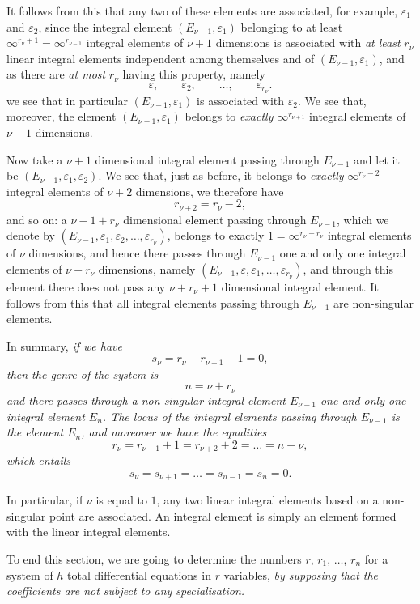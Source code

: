 \documentclass[leqno,11pt]{book}
\makeatletter
\theoremstyle{shape1}
\theoremstyle{shapesmall}
\let\old@epsilon\epsilon
\let\old@varepsilon\varepsilon
\let\epsilon\old@varepsilon
\let\varepsilon\old@epsilon
\makeatother
\begin{document}
It follows from this that any two of these elements are associated, for example, $\epsilon_{1}$ and $\epsilon_{2}$, since the integral element $(E_{\nu-1},\epsilon_{1})$ belonging to at least $\infty^{r_{\nu}+1}=\infty^{r_{\nu-1}}$ integral elements of $\nu+1$ dimensions is associated with \emph{at least} $r_{\nu}$ linear integral elements independent among themselves and of $(E_{\nu-1},\epsilon_{1})$, and as there are \emph{at most} $r_{\nu}$ having this property, namely
\[
\epsilon,\qquad\epsilon_{2},\qquad\dots,\qquad\epsilon_{r_{\nu}}.
\]
we see that in particular $(E_{\nu-1},\epsilon_{1})$ is associated with $\epsilon_{2}$. We see that, moreover, the element $(E_{\nu-1},\epsilon_{1})$ belongs to \emph{exactly} $\infty^{r_{\nu+1}}$ integral elements of $\nu+1$ dimensions.

Now take a $\nu+1$ dimensional integral element passing through $E_{\nu-1}$ and let it be $(E_{\nu-1},\epsilon_{1},\epsilon_{2})$. We see that, just as before, it belongs to \emph{exactly} $\infty^{r_{\nu}-2}$ integral elements of $\nu+2$ dimensions, we therefore have
\[
r_{\nu+2}=r_{\nu}-2,
\]
and so on: a $\nu-1+r_{\nu}$ dimensional element passing through $E_{\nu-1}$, which we denote by $(E_{\nu-1},\epsilon_{1},\epsilon_{2},\dots,\epsilon_{r_{\nu}})$, belongs to exactly $1=\infty^{r_{\nu}-r_{\nu}}$ integral elements of $\nu$ dimensions, and hence there passes through $E_{\nu-1}$ one and only one integral elements of $\nu+r_{\nu}$ dimensions, namely $(E_{\nu-1},\epsilon,\epsilon_{1},\dots,\epsilon_{r_{\nu}})$, and through this element there does not pass any $\nu+r_{\nu}+1$ dimensional integral element. It follows from this that all integral elements passing through $E_{\nu-1}$ are non-singular elements.

In summary, \emph{if we have}
\[
s_{\nu}=r_{\nu}-r_{\nu+1}-1=0,
\]
\emph{then the genre of the system is}
\[
n=\nu+r_{\nu}
\]
\emph{and there passes through a non-singular integral element $E_{\nu-1}$ one and only one integral element $E_{n}$. The locus of the integral elements passing through $E_{\nu-1}$ is the element $E_{n}$, and moreover we have the equalities}
\[
r_{\nu}=r_{\nu+1}+1=r_{\nu+2}+2=\dots=n-\nu,
\]
\emph{which entails}
\[
s_{\nu}=s_{\nu+1}=\dots=s_{n-1}=s_{n}=0.
\]

In particular, if $\nu$ is equal to $1$, any two linear integral elements based on a non-singular point are associated. An integral element is simply an element formed with the linear integral elements.

To end this section, we are going to determine the numbers $r$, $r_{1}$, $\dots$, $r_{n}$ for a system of $h$ total differential equations in $r$ variables, \emph{by supposing that the coefficients are not subject to any specialisation.}
\end{document}
